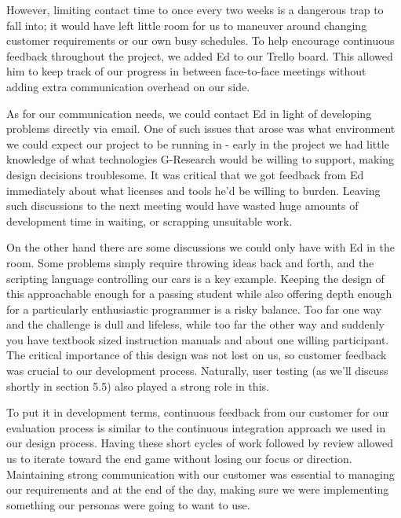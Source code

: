 However, limiting contact time to once every two weeks is a dangerous trap to fall into; it would have left little room for us to maneuver around changing customer requirements or our own busy schedules. To help encourage continuous feedback throughout the project, we added Ed to our Trello board. This allowed him to keep track of our progress in between face-to-face meetings without adding extra communication overhead on our side. 

As for our communication needs, we could contact Ed in light of developing problems directly via email. One of such issues that arose was what environment we could expect our project to be running in - early in the project we had little knowledge of what technologies G-Research would be willing to support, making design decisions troublesome. It was critical that we got feedback from Ed immediately about what licenses and tools he'd be willing to burden. Leaving such discussions to the next meeting would have wasted huge amounts of development time in waiting, or scrapping unsuitable work.

On the other hand there are some discussions we could only have with Ed in the room. Some problems simply require throwing ideas back and forth, and the scripting language controlling our cars is a key example. Keeping the design of this approachable enough for a passing student while also offering depth enough for a particularly enthusiastic programmer is a risky balance. Too far one way and the challenge is dull and lifeless, while too far the other way and suddenly you have textbook sized instruction manuals and about one willing participant. The critical importance of this design was not lost on us, so customer feedback was crucial to our development process. Naturally, user testing (as we'll discuss shortly in section 5.5) also played a strong role in this.

To put it in development terms, continuous feedback from our customer for our evaluation process is similar to the continuous integration approach we used in our design process. Having these short cycles of work followed by review allowed us to iterate toward the end game without losing our focus or direction. Maintaining strong communication with our customer was essential to managing our requirements and at the end of the day, making sure we were implementing something our personas were going to want to use. 

